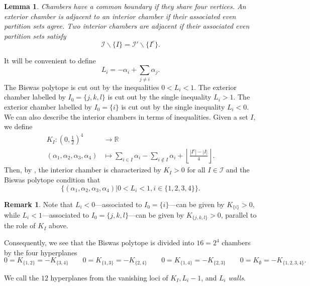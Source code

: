 \documentclass[12pt,letterpaper,reqno]{amsart}
\newtheorem{lem}[thm]{Lemma}
\theoremstyle{remark}
\theoremstyle{definition}
\newtheorem{rem}[thm]{Remark}
\numberwithin{thm}{section}
\numberwithin{equation}{section}
\numberwithin{figure}{section}
\newcommand{\R}{\ensuremath{\mathbb R}}
\begin{document}
\begin{lem}
\label{lem:adjacentchambers}Chambers have a common boundary if they share four vertices. An exterior chamber is adjacent to an interior chamber if their associated even partition sets agree.
Two interior chambers 
are adjacent if their associated even partition sets satisfy
\begin{equation}\label{eq:wallcrossing}\mathcal{I}\backslash\{I\}= \mathcal{I}'\backslash \{I^c\}.\end{equation}
\end{lem}
\medskip

It will be convenient to define 
\begin{equation} 
  L_{i} =-\alpha_i + \sum_{j \neq i} \alpha_j.  \label{eq:L}\end{equation}
The Biswas polytope is cut out by the inequalities $0 < L_i < 1$. The exterior chamber labelled by $I_0=\{j, k, l\}$ is cut out by the single inequality $L_i > 1$. The exterior chamber labelled by $I_0=\{i\}$ is cut out by the single inequality $L_i < 0$.
We can also describe the interior chambers in terms of inequalities.  Given a set $I$, we define 
\begin{align}\label{eq:K} K_I : \left(0, \frac{1}{2}\right)^4 &\rightarrow \R\\ \nonumber
 (\alpha_{1}, \alpha_{2}, \alpha_{3}, \alpha_{4}) & \mapsto \sum_{i \in I}\alpha_{i}- \sum_{i \notin I} \alpha_{i} + \left\lfloor\frac{|I^c|-|I|}{4}\right\rfloor.\end{align}
 Then, by \cite[Corollary 5]{Meneses}, the interior chamber is characterized by $K_I>0$ for all $I \in \mathcal{I}$ and the Biswas polytope condition that 
 $$\{(\alpha_{1}, \alpha_{2}, \alpha_{3}, \alpha_{4})| 0 < L_i < 1, i \in \{1, 2, 3, 4\}\}.$$
 \begin{rem}\label{rem:KvsL}Note that $L_i < 0$---associated to $I_0 = \{i\}$---can be given by $K_{\{i\}} > 0 $, 
 while $L_i < 1$---associated to $I_0 =\{j, k, l \}$---can be given by $K_{\{j, k, l \}} > 0$, 
 parallel to the role of $K_I$ above.
 \end{rem}
 
 Consequently, we see that the Biswas polytope is divided into $16=2^4$ chambers by the four hyperplanes
\[0=K_{\{1,2\}}=-K_{\{3,4\}} \qquad 0=K_{\{1,3\}} = -K_{\{2,4\}} \qquad 0=K_{\{1,4\}}=-K_{\{2,3\}} \qquad 0=K_{\emptyset}=-K_{\{1,2, 3, 4\}}.\]

We call the $12$ hyperplanes from the vanishing loci of $K_I, L_i-1$, and $L_i$  \emph{walls}. 
 
\end{document}
